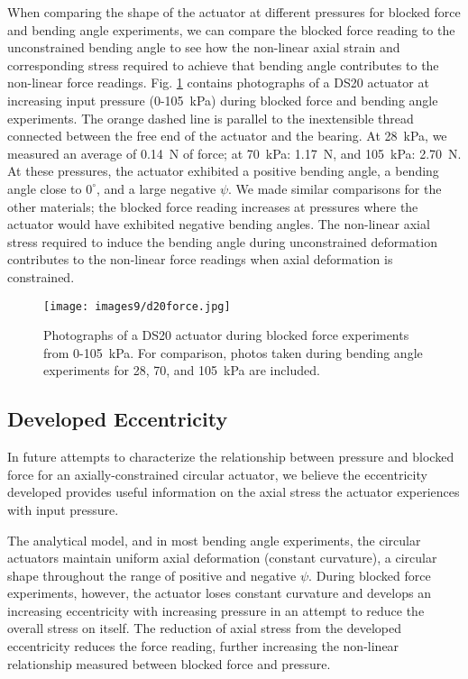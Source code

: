 When comparing the shape of the actuator at different pressures for blocked force and bending angle experiments, we can compare the blocked force reading to the unconstrained bending angle to see how the non-linear axial strain and corresponding stress required to achieve that bending angle contributes to the non-linear force readings. Fig. \ref{fig:d20force} contains photographs of a DS20 actuator at increasing input pressure (0-105~kPa) during blocked force and bending angle experiments. The orange dashed line is parallel to the inextensible thread connected between the free end of the actuator and the bearing. At 28~kPa, we measured an average of 0.14~N of force; at 70~kPa: 1.17~N, and 105~kPa: 2.70~N. At these pressures, the actuator exhibited a positive bending angle, a bending angle close to $0^\circ$, and a large negative $\psi$. We made similar comparisons for the other materials; the blocked force reading increases at pressures where the actuator would have exhibited negative bending angles. The non-linear axial stress required to induce the bending angle during unconstrained deformation contributes to the non-linear force readings when axial deformation is constrained. 

\begin{figure}[ht]
    \centering
     \texttt{[image: images9/d20force.jpg]}
    \caption{Photographs of a DS20 actuator during blocked force experiments from 0-105~kPa. For comparison, photos taken during bending angle experiments for 28, 70, and 105~kPa are included.}
    \label{fig:d20force}
\end{figure}

\clearpage
\subsection{Developed Eccentricity}

In future attempts to characterize the relationship between pressure and blocked force for an axially-constrained circular actuator, we believe the eccentricity developed provides useful information on the axial stress the actuator experiences with input pressure. 

The analytical model, and in most bending angle experiments, the circular actuators maintain uniform axial deformation (constant curvature), a circular shape throughout the range of positive and negative $\psi$. During blocked force experiments, however, the actuator loses constant curvature and develops an increasing eccentricity with increasing pressure in an attempt to reduce the overall stress on itself. The reduction of axial stress from the developed eccentricity reduces the force reading, further increasing the non-linear relationship measured between blocked force and pressure. 